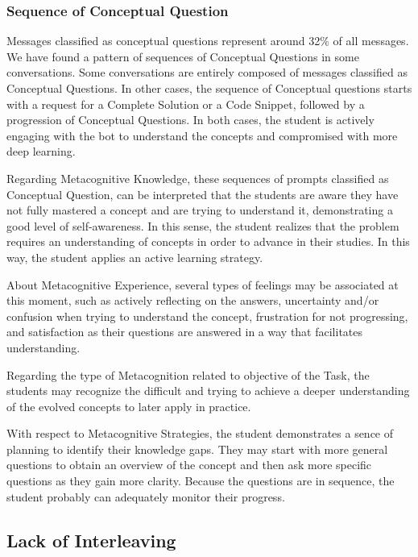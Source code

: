 \documentclass[a4paper,twoside]{article}
\begin{document}
\subsubsection*{Sequence of Conceptual Question}

Messages classified as conceptual questions represent around 32\% of all
messages. We have found a pattern of sequences of Conceptual Questions in some
conversations. Some conversations are entirely composed of messages classified
as Conceptual Questions. In other cases, the sequence of Conceptual questions
starts with a request for a Complete Solution or a Code Snippet, followed by
a progression of Conceptual Questions. In both cases, the student is actively
engaging with the bot to understand the concepts and compromised with more
deep learning.

Regarding Metacognitive Knowledge, these sequences of prompts classified as
Conceptual Question, can be interpreted that the students are aware they have
not fully mastered a concept and are trying to understand it, demonstrating a
good level of self-awareness. In this sense, the student realizes that the
problem requires an understanding of concepts in order to advance in their
studies. In this way, the student applies an active learning strategy.

About Metacognitive Experience, several types of feelings may be associated at
this moment, such as actively reflecting on the answers, uncertainty and/or
confusion when trying to understand the concept, frustration for not
progressing, and satisfaction as their questions are answered in a way that
facilitates understanding.

Regarding the type of Metacognition related to objective of the Task, the
students may recognize the difficult and trying to achieve a deeper
understanding of the evolved concepts to later apply in practice.

With respect to Metacognitive Strategies, the student demonstrates a sence of
planning to identify their knowledge gaps. They may start with more general
questions to obtain an overview of the concept and then ask more specific
questions as they gain more clarity. Because the questions are in sequence, the
student probably can adequately monitor their progress.

\subsection*{Lack of Interleaving}
\end{document}
